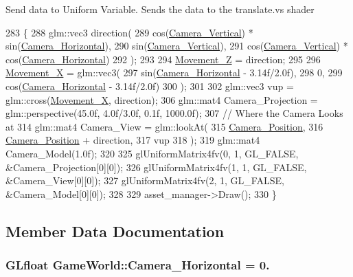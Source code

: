 Send data to Uniform Variable. Sends the data to the translate.\+vs shader
\begin{DoxyCode}
283                      \{
288         glm::vec3 direction(
289         cos(\hyperlink{classGameWorld_a26658e739c4d267b1be35ed820089931}{Camera\_Vertical}) * sin(\hyperlink{classGameWorld_a7f4911dda9b3b4e4eb03ece87e16cd96}{Camera\_Horizontal}),
290         sin(\hyperlink{classGameWorld_a26658e739c4d267b1be35ed820089931}{Camera\_Vertical}),
291         cos(\hyperlink{classGameWorld_a26658e739c4d267b1be35ed820089931}{Camera\_Vertical}) * cos(\hyperlink{classGameWorld_a7f4911dda9b3b4e4eb03ece87e16cd96}{Camera\_Horizontal})
292     );
293 
294     \hyperlink{classGameWorld_a8dd30ba92e7fa9b9b05075e31d1e7dd8}{Movement\_Z} = direction;
295 
296     \hyperlink{classGameWorld_a968eb29424b68f7cd79a5896c62e944d}{Movement\_X} = glm::vec3(
297         sin(\hyperlink{classGameWorld_a7f4911dda9b3b4e4eb03ece87e16cd96}{Camera\_Horizontal} - 3.14f/2.0f),
298         0,
299         cos(\hyperlink{classGameWorld_a7f4911dda9b3b4e4eb03ece87e16cd96}{Camera\_Horizontal} - 3.14f/2.0f)
300     );
301 
302     glm::vec3 vup = glm::cross(\hyperlink{classGameWorld_a968eb29424b68f7cd79a5896c62e944d}{Movement\_X}, direction);
306     glm::mat4 Camera\_Projection = glm::perspective(45.0f, 4.0f/3.0f, 0.1f, 1000.0f);
307         \textcolor{comment}{// Where the Camera Looks at}
314 \textcolor{comment}{}    glm::mat4 Camera\_View = glm::lookAt(
315         \hyperlink{classGameWorld_ad80e597474ea4c52a583e81788187571}{Camera\_Position},
316         \hyperlink{classGameWorld_ad80e597474ea4c52a583e81788187571}{Camera\_Position} + direction,
317         vup
318     );
319     glm::mat4 Camera\_Model(1.0f);
320 
325     glUniformMatrix4fv(0, 1, GL\_FALSE, &Camera\_Projection[0][0]);
326     glUniformMatrix4fv(1, 1, GL\_FALSE, &Camera\_View[0][0]);
327     glUniformMatrix4fv(2, 1, GL\_FALSE, &Camera\_Model[0][0]);
328 
329         asset\_manager->Draw();
330 \}
\end{DoxyCode}


\subsection{Member Data Documentation}
\hypertarget{classGameWorld_a7f4911dda9b3b4e4eb03ece87e16cd96}{}
\subsubsection[{Camera\+\_\+\+Horizontal}]{\setlength{\rightskip}{0pt plus 5cm}G\+Lfloat Game\+World\+::\+Camera\+\_\+\+Horizontal = 0.}\label{classGameWorld_a7f4911dda9b3b4e4eb03ece87e16cd96}
\hypertarget{classGameWorld_ad80e597474ea4c52a583e81788187571}{}

